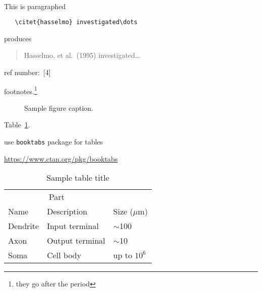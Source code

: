 \documentclass{article}
\begin{document}
\paragraph{}This is paragraphed
\begin{verbatim}
   \citet{hasselmo} investigated\dots
\end{verbatim}
produces
\begin{quote}
  Hasselmo, et al.\ (1995) investigated\dots
\end{quote}

ref number:\ [4]

footnotes.\footnote{they go after the period}

\begin{figure}[h]
  \centering
  \fbox{\rule[-.5cm]{0cm}{4cm} \rule[-.5cm]{4cm}{0cm}}
  \caption{Sample figure caption.}
\end{figure}

Table~\ref{sample-table}.

use \verb+booktabs+ package for tables
\begin{center}
  \url{https://www.ctan.org/pkg/booktabs}
\end{center}

\begin{table}[t]
  \caption{Sample table title}
  \label{sample-table}
  \centering
  \begin{tabular}{lll}
    \toprule
    \multicolumn{2}{c}{Part}                   \\
    \cmidrule{1-2}
    Name     & Description     & Size ($\mu$m) \\
    \midrule
    Dendrite & Input terminal  & $\sim$100     \\
    Axon     & Output terminal & $\sim$10      \\
    Soma     & Cell body       & up to $10^6$  \\
    \bottomrule
  \end{tabular}
\end{table}
\end{document}
